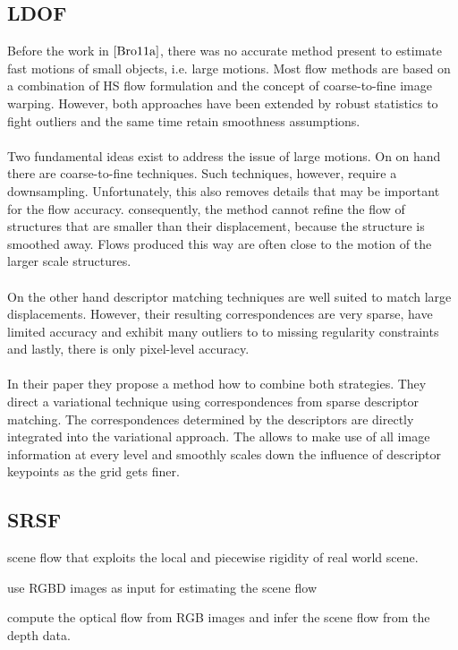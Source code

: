 \subsection{LDOF}
Before the work in $\cite{Bro11a}$, there was no accurate method present to estimate fast motions of small objects, i.e. large motions. Most flow methods are based on a combination of HS flow formulation and the concept of coarse-to-fine image warping. However, both approaches have been extended by robust statistics to fight outliers and the same time retain smoothness assumptions. \\ \\
Two fundamental ideas exist to address the issue of large motions. On on hand there are coarse-to-fine techniques. Such techniques, however, require a downsampling. Unfortunately, this also removes details that may be important for the flow accuracy. consequently, the method cannot refine the flow of structures that are smaller than their displacement, because the structure is smoothed away. Flows produced this way are often close to the motion of the larger scale structures. \\ \\
On the other hand descriptor matching techniques are well suited to match large displacements. However, their resulting correspondences are very sparse, have limited accuracy and exhibit many outliers to to missing regularity constraints and lastly, there is only pixel-level accuracy. \\ \\
In their paper they propose a method how to combine both strategies. They direct a variational technique using correspondences from sparse descriptor matching. The correspondences determined by the descriptors are directly integrated into the variational approach. The allows to make use of all image information at every level and smoothly scales down the influence of descriptor keypoints as the grid gets finer.

\subsection{SRSF}

scene flow that exploits the local and piecewise rigidity of real world scene. 

use RGBD images as input for estimating the scene flow

compute the optical flow from RGB images and infer the scene flow from the depth data.


